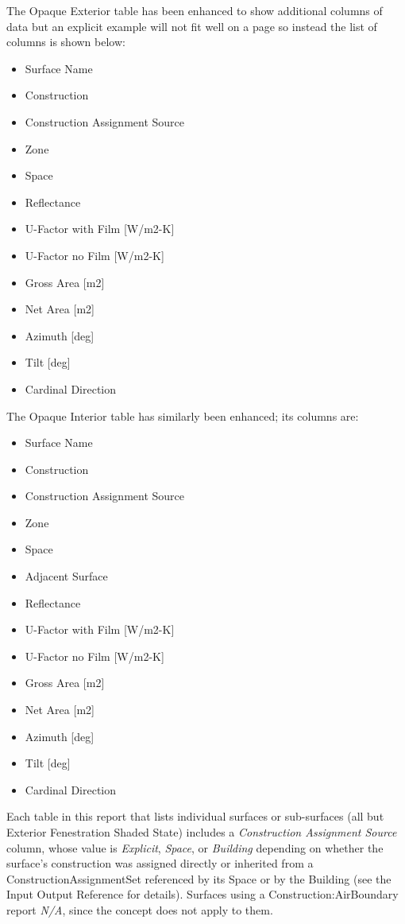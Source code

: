 The Opaque Exterior table has been enhanced to show additional columns of data but an explicit example will not fit well on a page so instead the list of columns is shown below:

\begin{itemize}
\item
  Surface Name
\item
  Construction
\item
  Construction Assignment Source
\item
  Zone
\item
  Space
\item
  Reflectance
\item
  U-Factor with Film [W/m2-K]
\item
  U-Factor no Film [W/m2-K]
\item
  Gross Area [m2]
\item
  Net Area [m2]
\item
  Azimuth [deg]
\item
  Tilt [deg]
\item
  Cardinal Direction
\end{itemize}

The Opaque Interior table has similarly been enhanced; its columns are:

\begin{itemize}
\item
  Surface Name
\item
  Construction
\item
  Construction Assignment Source
\item
  Zone
\item
  Space
\item
  Adjacent Surface
\item
  Reflectance
\item
  U-Factor with Film [W/m2-K]
\item
  U-Factor no Film [W/m2-K]
\item
  Gross Area [m2]
\item
  Net Area [m2]
\item
  Azimuth [deg]
\item
  Tilt [deg]
\item
  Cardinal Direction
\end{itemize}

Each table in this report that lists individual surfaces or sub-surfaces (all but Exterior Fenestration Shaded State) includes a \emph{Construction Assignment Source} column, whose value is \emph{Explicit}, \emph{Space}, or \emph{Building} depending on whether the surface's construction was assigned directly or inherited from a ConstructionAssignmentSet referenced by its Space or by the Building (see the Input Output Reference for details). Surfaces using a Construction:AirBoundary report \emph{N/A}, since the concept does not apply to them.

